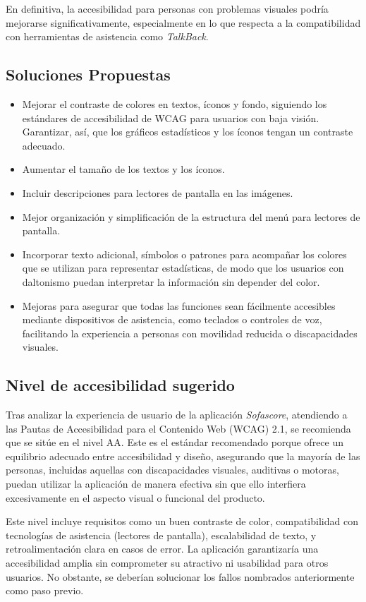 \documentclass[]{article}
\begin{document}
En definitiva, la accesibilidad para personas con problemas visuales podría mejorarse significativamente, especialmente en lo que respecta a la compatibilidad con herramientas de asistencia como \textit{TalkBack}.

\subsection{Soluciones Propuestas}
\begin{itemize}
	\item Mejorar el contraste de colores en textos, íconos y fondo, siguiendo los estándares de accesibilidad de WCAG para usuarios con baja visión. Garantizar, así, que los gráficos estadísticos y los íconos tengan un contraste adecuado.
	\item Aumentar el tamaño de los textos y los íconos.
	\item Incluir descripciones para lectores de pantalla en las imágenes.
	\item Mejor organización y simplificación de la estructura del menú para lectores de pantalla.
	\item Incorporar texto adicional, símbolos o patrones para acompañar los colores que se utilizan para representar estadísticas, de modo que los usuarios con daltonismo puedan interpretar la información sin depender del color.
	\item Mejoras para asegurar que todas las funciones sean fácilmente accesibles mediante dispositivos de asistencia, como teclados o controles de voz, facilitando la experiencia a personas con movilidad reducida o discapacidades visuales.
\end{itemize}

\subsection{Nivel de accesibilidad sugerido}

Tras analizar la experiencia de usuario de la aplicación \textit{Sofascore}, atendiendo a las Pautas de Accesibilidad para el Contenido Web (WCAG) 2.1, se recomienda que se sitúe en el nivel AA. Este es el estándar recomendado porque ofrece un equilibrio adecuado entre accesibilidad y diseño, asegurando que la mayoría de las personas, incluidas aquellas con discapacidades visuales, auditivas o motoras, puedan utilizar la aplicación de manera efectiva sin que ello interfiera excesivamente en el aspecto visual o funcional del producto.

Este nivel incluye requisitos como un buen contraste de color, compatibilidad con tecnologías de asistencia (lectores de pantalla), escalabilidad de texto, y retroalimentación clara en casos de error. La aplicación garantizaría una accesibilidad amplia sin comprometer su atractivo ni usabilidad para otros usuarios. No obstante, se deberían solucionar los fallos nombrados anteriormente como paso previo.
\end{document}
